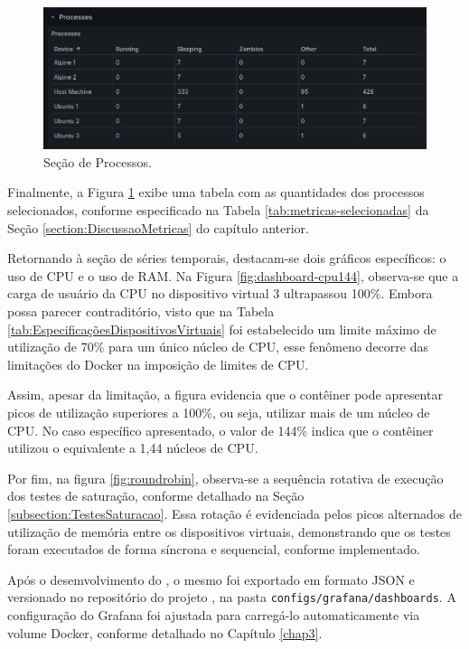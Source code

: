 {\begin{figure}[H]
\centering
\color{red}
\setlength{\abovecaptionskip}{-20pt}
\includegraphics[width=\textwidth]{Imagens/chap04/dashboard/processes.png}
\caption{Seção de Processos.}
\label{fig:dashboard-processes}
\end{figure}

Finalmente, a Figura \ref{fig:dashboard-processes} exibe uma tabela com as quantidades dos processos selecionados, conforme especificado na Tabela \ref{tab:metricas-selecionadas} da Seção \ref{section:DiscussaoMetricas} do capítulo anterior.

Retornando à seção de séries temporais, destacam-se dois gráficos específicos: o uso de CPU e o uso de RAM. Na Figura \ref{fig:dashboard-cpu144}, observa-se que a carga de usuário da CPU no dispositivo virtual 3 ultrapassou 100\%. Embora possa parecer contraditório, visto que na Tabela \ref{tab:EspecificaçõesDispositivosVirtuais} foi estabelecido um limite máximo de utilização de 70\% para um único núcleo de CPU, esse fenômeno decorre das limitações do Docker na imposição de limites de CPU.

Assim, apesar da limitação, a figura evidencia que o contêiner pode apresentar picos de utilização superiores a 100\%, ou seja, utilizar mais de um núcleo de CPU. No caso específico apresentado, o valor de 144\% indica que o contêiner utilizou o equivalente a 1,44 núcleos de CPU.

Por fim, na figura \ref{fig:roundrobin}, observa-se a sequência rotativa de execução dos testes de saturação, conforme detalhado na Seção \ref{subsection:TestesSaturacao}. Essa rotação é evidenciada pelos picos alternados de utilização de memória entre os dispositivos virtuais, demonstrando que os testes foram executados de forma síncrona e sequencial, conforme implementado.

Após o desemvolvimento do , o mesmo foi exportado em formato JSON e versionado no repositório do projeto \citep{vitorcossetti2025}, na pasta \verb|configs/grafana/dashboards|. A configuração do Grafana foi ajustada para carregá-lo automaticamente via volume Docker, conforme detalhado no Capítulo \ref{chap3}.

}
